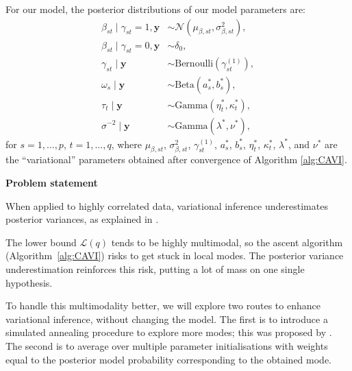 \documentclass[final]{beamer}
\DeclareMathOperator*{\KL}{{\rm KL}}
\begin{document}
\begin{multicols*}{3}
For our model, the posterior distributions of our model parameters are:
\begin{align*}
\beta_{st} \mid \gamma_{st} = 1, \boldsymbol{y} &\sim \mathcal{N}\left(\mu_{\beta, st},\sigma^2_{\beta, st}\right),\\
\beta_{st} \mid \gamma_{st} = 0, \boldsymbol{y} &\sim \delta_0,\\
\gamma_{st} \mid \boldsymbol{y} &\sim \text{Bernoulli}(\gamma_{st}^{(1)}),\\
\omega_s\mid\boldsymbol{y} &\sim \text{Beta}(a_s^*,b_s^*),\\
\tau_t\mid \boldsymbol{y} &\sim \text{Gamma}(\eta^*_t, \kappa^*_t),\\
\sigma^{-2} \mid \boldsymbol{y} &\sim \text{Gamma}(\lambda^*, \nu^*),
\end{align*}
for $s=1,\dots,p$, $t=1,\dots,q$, where $\mu_{\beta,st}$, $\sigma^2_{\beta,st}$, $\gamma_{st}^{(1)}$, $a_s^*$, $b_s^*$, $\eta_t^*$, $\kappa_t^*$, $\lambda^*$, and $\nu^*$ are the ``variational'' parameters obtained after convergence of Algorithm \ref{alg:CAVI}. 

\vspace{1em}

\textbf{\large Problem statement}

\vspace{1em}
When applied to highly correlated data, variational inference underestimates posterior variances, as explained in \citet{varInf}. 

The lower bound $\mathcal{L}(q)$ tends to be highly multimodal, so the ascent algorithm (Algorithm~\ref{alg:CAVI}) risks to get stuck in local modes. The posterior variance underestimation reinforces this risk, putting a lot of mass on one single hypothesis.

To handle this multimodality better, we will explore two routes to enhance variational inference, without changing the model. The first is to introduce a simulated annealing procedure to explore more modes; this was proposed by \citet{glob_loc}. The second is to average over multiple parameter initialisations with weights equal to the posterior model probability corresponding to the obtained mode.


\end{multicols*}
\end{document}
